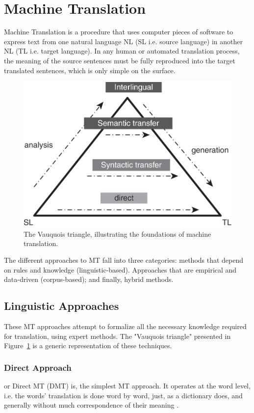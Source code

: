 \section{Machine Translation}
Machine Translation is a procedure that uses computer pieces of software to express text from one natural language NL (SL i.e. source language) in another NL (TL i.e. target language). In any human or automated translation process, the meaning of the source sentences must be fully reproduced into the target translated sentences, which is only simple on the surface.

\begin{figure}[htbp]
	\centerline{\includegraphics[scale=.7]{Figures/fig1.4.png}}
	\caption{The Vauquois triangle, illustrating the foundations of machine translation.}
	\label{fig1.4.png}
\end{figure}

The different approaches to MT fall into three categories: methods that depend on rules and knowledge (linguistic-based). Approaches that are empirical and data-driven (corpus-based); and finally, hybrid methods.

\subsection{Linguistic Approaches}
These MT approaches attempt to formalize all the necessary knowledge required for translation, using expert methods. The "Vauquois triangle" presented in Figure~\ref{fig1.4.png} is a generic representation of these techniques.

\subsubsection{\textbf{Direct Approach}}
or Direct MT (DMT) is, the simplest MT approach. It operates at the word level, i.e. the words' translation is done word by word, just, as a dictionary does, and generally without much correspondence of their meaning \cite{okpor14}.

